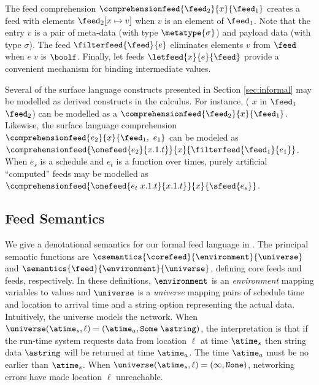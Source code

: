 The feed comprehension $\comprehensionfeed{\feed_2}{x}{\feed_1}$
creates a feed with elements $\feed_2[x \mapsto v]$ when $v$ is an
element of $\feed_1$. Note that the entry $v$ is a pair of meta-data
(with type $\metatype{\sigma}$) and payload data (with type $\sigma$).
The feed $\filterfeed{\feed}{e}$ eliminates elements $v$ from $\feed$ when
$e\; v$ is $\boolf$.  Finally, let feeds $\letfeed{x}{e}{\feed}$
provide a convenient mechanism for binding intermediate values. 

Several of the surface language constructs presented in Section \ref{sec:informal} may be modelled as derived constructs in the calculus.  For instance,
( $x$ in $\feed_1$  $\feed_2$) 
can be modelled as a  $\comprehensionfeed{\feed_2}{x}{\feed_1}$. 
Likewise, the surface language comprehension
$\comprehensionfeed{e_2}{x}{\feed_1,~ e_1}$ can be modeled as
$\comprehensionfeed{\onefeed{e_2}{x.1.t}}{x}{\filterfeed{\feed_1}{e_1}}$. 
When $e_s$ is a schedule and $e_t$ is a function over times, purely artificial 
``computed'' feeds may be modelled as 
$\comprehensionfeed{\onefeed{e_t\; x.1.t}{x.1.t}}{x}{\sfeed{e_s}}$.



\subsection{Feed Semantics}
We give a denotational semantics for our formal feed language in 
.  The principal semantic functions are
$\csemantics{\corefeed}{\environment}{\universe}$ and
$\semantics{\feed}{\environment}{\universe}$, defining core feeds and
feeds, respectively.  In these definitions,
$\environment$ is an {\em environment} mapping variables to values
and $\universe$ is a {\em universe} mapping pairs of
schedule time and location to arrival time and a string option
representing the actual data.
Intuitively, the universe models the network.
When $\universe (\atime_s, \ell) = (\atime_a, \mathtt{Some} \; \astring)$,
 the interpretation is that if the run-time system requests data
from location $\ell$ at time $\atime_s$ then string data $\astring$
will be returned at time $\atime_a$.  The time $\atime_a$ must be
no earlier than $\atime_s$.
When $\universe (\atime_s, \ell) = (\infty, \mathtt{None})$,
networking errors have made location $\ell$ unreachable.


